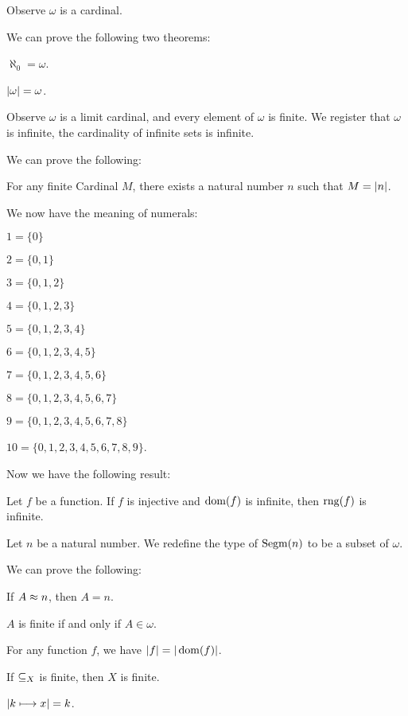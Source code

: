 \documentclass{article}
\begin{document}
Observe $\omega$ is a cardinal.

We can prove the following two theorems:
\begin{thm}
\item\label{card1:46} $\aleph_{0}=\omega$.
\item\label{card1:47} $|\omega|=\omega$.
\end{thm}

Observe $\omega$ is a limit cardinal, and every element of $\omega$ is finite.
We register that $\omega$ is infinite, the cardinality of infinite sets
is infinite.

We can prove the following:
\begin{thm}
\item\label{card1:48} For any finite Cardinal $M$, there exists a
  natural number $n$ such that $M=|n|$.
\end{thm}

We now have the meaning of numerals:
\begin{thm}
\item\label{card1:49} $1=\{0\}$
\item\label{card1:50} $2=\{0,1\}$
\item\label{card1:51} $3=\{0,1,2\}$
\item\label{card1:52} $4=\{0,1,2,3\}$
\item\label{card1:53} $5=\{0,1,2,3,4\}$
\item\label{card1:54} $6=\{0,1,2,3,4,5\}$
\item\label{card1:55} $7=\{0,1,2,3,4,5,6\}$
\item\label{card1:56} $8=\{0,1,2,3,4,5,6,7\}$
\item\label{card1:57} $9=\{0,1,2,3,4,5,6,7,8\}$
\item\label{card1:58} $10=\{0,1,2,3,4,5,6,7,8,9\}$.
\end{thm}

Now we have the following result:
\begin{thm}
\item\label{card1:59} Let $f$ be a function. If $f$ is injective and
  $\operatorname{dom}(f)$ is infinite, then $\operatorname{rng}(f)$ is infinite.
\end{thm}

\begin{definition}
Let $n$ be a natural number. We redefine the type of $\operatorname{Segm}(n)$ to be a
subset of $\omega$.
\end{definition}

We can prove the following:
\begin{thm}
\item\label{card1:60} If $A\approx n$, then $A=n$.
\item\label{card1:61} $A$ is finite if and only if $A\in\omega$.
\item\label{card1:62} For any function $f$, we have $|f|=|\operatorname{dom}(f)|$.
\item\label{card1:63} If $\mathord{\subseteq_{X}}$ is finite, then $X$ is finite.
\item\label{card1:64} $|k\longmapsto x|=k$.
\end{thm}
\end{document}
